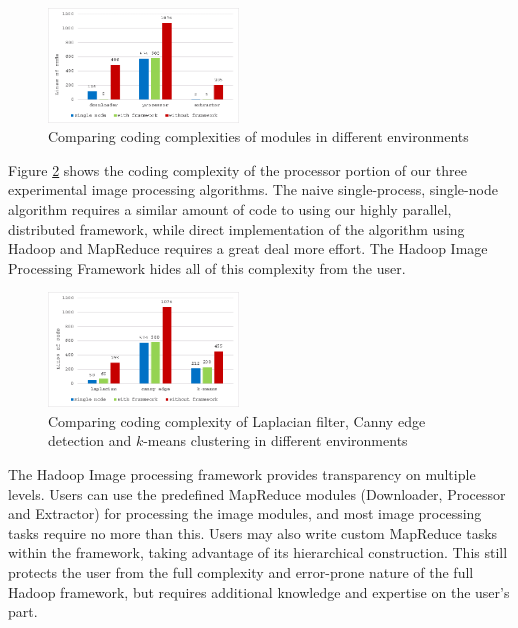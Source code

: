 \documentclass[conference]{IEEEtran}
\begin{document}
\begin{figure}[h]
  \centering
  \includegraphics[width=0.45\textwidth]{module-chart2}
  \caption{Comparing coding complexities of modules in different
    environments}
  \label{fig:module-chart}
\end{figure}

Figure \ref{fig:comp-chart} shows the coding complexity of the
processor portion of our three experimental image processing
algorithms.  The naive single-process, single-node algorithm requires
a similar amount of code to using our highly parallel, distributed
framework, while direct implementation of the algorithm using Hadoop
and MapReduce requires a great deal more effort.  The Hadoop Image
Processing Framework hides all of this complexity from the user.

\begin{figure}[h]
  \centering
  \includegraphics[width=0.45\textwidth]{comp-chart}
  \caption{Comparing coding complexity of Laplacian filter,
    Canny edge detection and $k$-means clustering in different
    environments}
  \label{fig:comp-chart}
\end{figure}

The Hadoop Image processing framework provides transparency on
multiple levels.  Users can use the predefined MapReduce modules
(Downloader, Processor and Extractor) for processing the image
modules, and most image processing tasks require no more than this.
Users may also write custom MapReduce tasks within the framework,
taking advantage of its hierarchical construction.  This still
protects the user from the full complexity and error-prone nature of
the full Hadoop framework, but requires additional knowledge and
expertise on the user's part.
\end{document}
